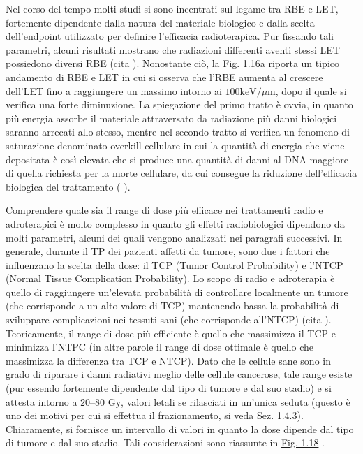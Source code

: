 \documentclass[12pt,a4paper,twoside]{report}
\begin{document}
	Nel corso del tempo molti studi si sono incentrati sul legame tra RBE e LET, fortemente dipendente dalla natura del materiale biologico e dalla scelta dell'endpoint utilizzato per definire l'efficacia radioterapica. Pur fissando tali parametri, alcuni risultati mostrano che radiazioni differenti aventi stessi LET possiedono diversi RBE (cita
	). Nonostante ciò, la \hyperref[fig:let_rbe]{Fig. 1.16a} riporta un tipico andamento di RBE e LET in cui si osserva che l'RBE aumenta al crescere dell'LET fino a raggiungere un massimo intorno ai $100\mbox{keV}/\mu\mbox{m}$, dopo il quale si verifica una forte diminuzione. La spiegazione del primo tratto è ovvia, in quanto più energia assorbe il materiale attraversato da radiazione più danni biologici saranno arrecati allo stesso, mentre nel secondo tratto si verifica un fenomeno di saturazione denominato overkill cellulare in cui la quantità di energia che viene depositata è così elevata che si produce una quantità di danni al DNA maggiore di quella richiesta per la morte cellulare, da cui consegue la riduzione dell'efficacia biologica del trattamento (
	).
	
	Comprendere quale sia il range di dose più efficace nei trattamenti radio e adroterapici è molto complesso in quanto gli effetti radiobiologici dipendono da molti parametri, alcuni dei quali vengono analizzati nei paragrafi successivi. In generale, durante il TP dei pazienti affetti da tumore, sono due i fattori che influenzano la scelta della dose: il TCP (Tumor Control Probability) e l'NTCP (Normal Tissue Complication Probability). Lo scopo di radio e adroterapia è quello di raggiungere un'elevata probabilità di controllare localmente un tumore (che corrisponde a un alto valore di TCP) mantenendo bassa la probabilità di sviluppare complicazioni nei tessuti sani (che corrisponde all'NTCP) (cita
	). Teoricamente, il range di dose più efficiente è quello che massimizza il TCP e minimizza l'NTPC (in altre parole il range di dose ottimale è quello che massimizza la differenza tra TCP e NTCP). Dato che le cellule sane sono in grado di riparare i danni radiativi meglio delle cellule cancerose, tale range esiste (pur essendo fortemente dipendente dal tipo di tumore e dal suo stadio) e si attesta intorno a $20$--$80\mbox{ Gy}$, valori letali se rilasciati in un'unica seduta (questo è uno dei motivi per cui si effettua il frazionamento, si veda \hyperref[sec:sopravvivenza_cellulare]{Sez. 1.4.3}). Chiaramente, si fornisce un intervallo di valori in quanto la dose dipende dal tipo di tumore e dal suo stadio. Tali considerazioni sono riassunte in \hyperref[fig:tcp]{Fig. 1.18} .
	
\end{document}
